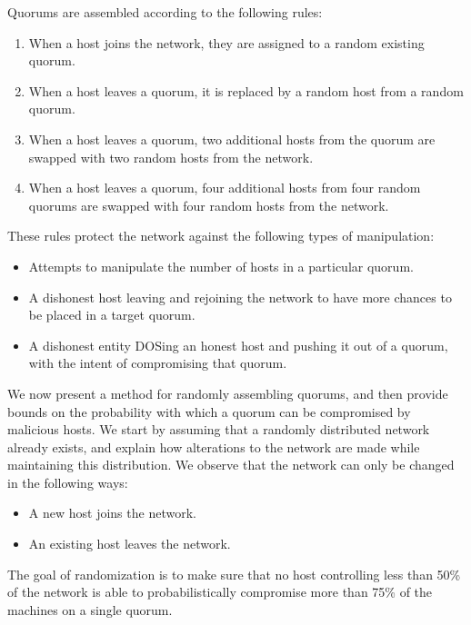 \documentclass[twocolumn]{article}
\begin{document}
Quorums are assembled according to the following rules:
\begin{enumerate}
	\item When a host joins the network, they are assigned to a random existing quorum.
	\item When a host leaves a quorum, it is replaced by a random host from a random quorum.
	\item When a host leaves a quorum, two additional hosts from the quorum are swapped with two random hosts from the network.
	\item When a host leaves a quorum, four additional hosts from four random quorums are swapped with four random hosts from the network.
\end{enumerate}

These rules protect the network against the following types of manipulation:
\begin{itemize}
	\item Attempts to manipulate the number of hosts in a particular quorum.
	\item A dishonest host leaving and rejoining the network to have more chances to be placed in a target quorum.
	\item A dishonest entity DOSing an honest host and pushing it out of a quorum, with the intent of compromising that quorum.
\end{itemize}




We now present a method for randomly assembling quorums, and then provide bounds on the probability with which a quorum can be compromised by malicious hosts.
We start by assuming that a randomly distributed network already exists, and explain how alterations to the network are made while maintaining this distribution.
We observe that the network can only be changed in the following ways:
\begin{itemize}
	\item A new host joins the network.
	\item An existing host leaves the network.
\end{itemize}

The goal of randomization is to make sure that no host controlling less than 50\% of the network is able to probabilistically compromise more than 75\% of the machines on a single quorum.
\end{document}
